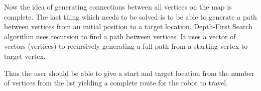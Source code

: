 \documentclass[../Head/Main.tex]{subfiles}
\begin{document}


Now the idea of generating connections between all vertices on the map is complete. The last thing which needs to be solved is to be able to generate a path between vertices from an initial position to a target location. Depth-First Search algorithm uses recursion to find a path between vertices. It uses a vector of vectors (vertices) to recursively generating a full path from a starting vertex to target vertex. 

Thus the user should be able to give a start and target location from the number of vertices from the list yielding a complete route for the robot to travel.
\end{document}

